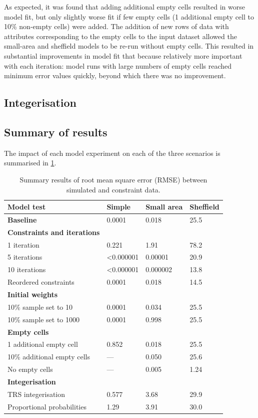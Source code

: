 \documentclass[a4paper,10pt]{article}
\begin{document}
As expected, it was found that adding additional empty cells
resulted in worse model fit, but only slightly worse fit if few empty
cells (1 additional empty cell to 10\% non-empty cells) were added.
The addition of new rows of data with attributes corresponding
to the empty cells to the input dataset allowed the small-area and sheffield
models to be re-run without empty cells. This resulted in substantial improvements in
model fit that because relatively more important with each iteration: model
runs with large numbers of empty cells reached minimum error values quickly, beyond
which there was no improvement.

\subsection{Integerisation}

\subsection{Summary of results}

The impact of each model experiment on each of the three scenarios
is summarised in \cref{tsum}.

\begin{table}[h]
\caption{Summary results of root mean square error (RMSE) between
simulated and constraint data.} \label{tsum}
\begin{center}
\begin{tabular}{llll}
\toprule
Model test & Simple & Small area  & Sheffield \\
\midrule
\textbf{Baseline} & 0.0001 & 0.018  & 25.5 \\
\midrule
\textbf{Constraints and iterations} &  &  & \\
1 iteration & 0.221 & 1.91 & 78.2 \\
5 iterations & \textless 0.000001 & 0.00001  & 20.9 \\
10 iterations & \textless 0.000001 & 0.000002  & 13.8 \\
Reordered constraints 		& 0.0001  & 0.018 & 14.5 \\ %
\midrule
\textbf{Initial weights} 	&  &  & \\
10\% sample set to 10  		& 0.0001 & 0.034  & 25.5\\
10\% sample set to 1000 	& 0.0001 & 0.998 & 25.5 \\
\midrule
\textbf{Empty cells} 		&  &  & \\
1 additional empty cell 	& 0.852 & 0.018  & 25.5 \\
10\% additional empty cells 	& --- & 0.050  & 25.6 \\
No empty cells			& --- & 0.005 & 1.24 \\
\midrule
\textbf{Integerisation} 	&  &  & \\
TRS integerisation				& 0.577 & 3.68  & 29.9 \\
Proportional probabilities & 1.29 & 3.91 & 30.0 \\
\bottomrule
\end{tabular}
\end{center}
\end{table}
\end{document}
